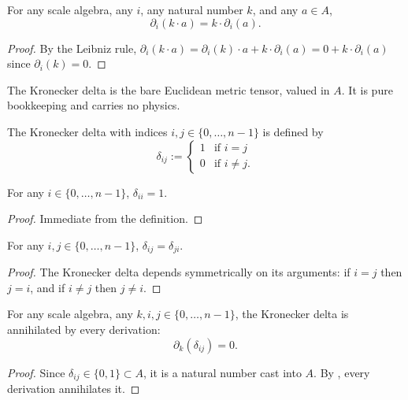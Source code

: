 \begin{theorem}
For any scale algebra, any $i$, any natural number $k$, and any $a \in A$,
$$\partial_i(k \cdot a) = k \cdot \partial_i(a).$$
\end{theorem}
\begin{proof}
By the Leibniz rule, $\partial_i(k \cdot a) = \partial_i(k) \cdot a + k \cdot \partial_i(a) = 0 + k \cdot \partial_i(a)$ since $\partial_i(k) = 0$.
\end{proof}

The Kronecker delta is the bare Euclidean metric tensor, valued in $A$. It is pure bookkeeping and carries no physics.

\begin{definition}
The Kronecker delta with indices $i, j \in \{0,\ldots,n-1\}$ is defined by
$$\delta_{ij} := \begin{cases} 1 & \text{if } i = j \\ 0 & \text{if } i \ne j. \end{cases}$$
\end{definition}

\begin{theorem}
For any $i \in \{0,\ldots,n-1\}$, $\delta_{ii} = 1$.
\end{theorem}
\begin{proof}
Immediate from the definition.
\end{proof}

\begin{theorem}
For any $i, j \in \{0,\ldots,n-1\}$, $\delta_{ij} = \delta_{ji}$.
\end{theorem}
\begin{proof}
The Kronecker delta depends symmetrically on its arguments: if $i = j$ then $j = i$, and if $i \ne j$ then $j \ne i$.
\end{proof}

\begin{theorem}
For any scale algebra, any $k, i, j \in \{0,\ldots,n-1\}$, the Kronecker delta is annihilated by every derivation:
$$\partial_k(\delta_{ij}) = 0.$$
\end{theorem}
\begin{proof}
Since $\delta_{ij} \in \{0, 1\} \subset A$, it is a natural number cast into $A$. By , every derivation annihilates it.
\end{proof}


